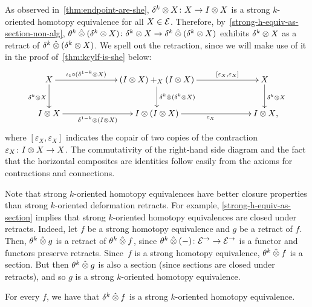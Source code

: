 \documentclass[reqno,10pt,a4paper,oneside,draft]{amsart}
\begin{document}
{{As observed in~\cref{thm:endpoint-are-she}, $\kcyl \otimes X \co X \to \interval \otimes X$ is a strong $k$-oriented homotopy equivalence for all $X \in \cal{E}$. 
Therefore, by~\cref{strong-h-equiv-as-section-non-alg}, $\thetak \hatotimes (\kcyl \otimes X)  \co \kcyl \otimes X \to \kcyl \hatotimes (\kcyl \otimes X)$ exhibits $\kcyl \otimes X$ as a retract of 
$\kcyl \hatotimes (\kcyl \otimes X)$. We spell out the retraction, since we will make use of it in the proof of~\cref{thm:kcylf-is-she} below:
\begin{equation}
\label{equ:kcyl-as-retract}
\begin{gathered}
\xymatrix@C+4em{
  X
  \ar[r]^-{\iota_1 \cc (\kcylinv \otimes X)}
  \ar[d]_{\kcyl \otimes X}
&
  (\interval \otimes X) +_X (\interval \otimes X)
  \ar[d]^{\kcyl \hatotimes (\kcyl \otimes X)}
  \ar[r]^-{[\varepsilon_X, \varepsilon_X]} 
&
  X
  \ar[d]^{\kcyl \otimes X}
\\
  \interval \otimes X
  \ar[r]_-{\kcylinv \otimes (\interval \otimes X)}
&
  \interval \otimes (\interval \otimes X)
  \ar[r]_{c_X} 
&
  \interval \otimes X
\rlap{,}}
\end{gathered}
\end{equation}
where $[\varepsilon_X, \varepsilon_X]$ indicates the copair of two copies of the contraction $\varepsilon_X \co \interval \otimes X \to X$. The commutativity of the right-hand side diagram
and the fact that the horizontal composites are identities follow easily from the axioms for contractions and connections. 


Note that strong $k$-oriented homotopy equivalences have better closure properties than strong $k$-oriented deformation retracts.
For example, \cref{strong-h-equiv-as-section} implies that strong $k$-oriented homotopy equivalences are closed under retracts.
Indeed, let $f$ be a strong homotopy equivalence and $g$ be a retract of $f$.
Then, $\thetak \hatotimes g$ is a retract of $\thetak \hatotimes f$, since $\thetak \hatotimes (-) \co \catE^\to \to \catE^\to$ is a functor and functors preserve retracts.
Since~$f$ is a strong homotopy equivalence, $\thetak \hatotimes f$ is a section.
But then $\thetak \hatotimes g$ is also a section (since sections are closed under retracts), and so $g$ is a strong $k$-oriented homotopy equivalence.

\begin{lemma} \label{thm:kcylf-is-she}
For every $f$, we have that $\kcyl \hatotimes f$ is a strong $k$-oriented homotopy equivalence.
\end{lemma}

}}
\end{document}

